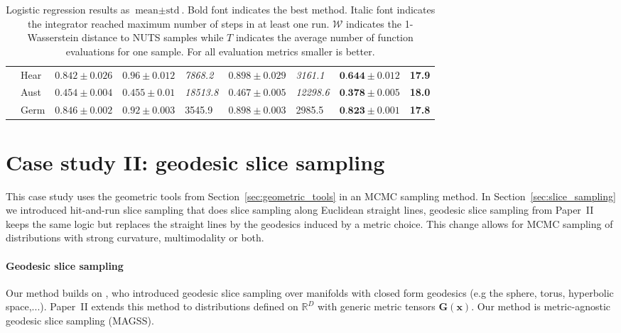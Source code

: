 \begin{table}
{\begin{tabular}{|l|l|l|l|l|l|l|l|l|}
			\cline{2-9}
			&Hear & $0.842 \pm 0.026$ & $0.96 \pm 0.012$ & \textit{7868.2} & $0.898 \pm 0.029$ & \textit{3161.1} & $\textbf{0.644} \pm 0.012$ & \textbf{17.9} \\
			\cline{2-9}
			&Aust & $0.454 \pm 0.004$ & $0.455 \pm 0.01$ & \textit{18513.8} & $0.467 \pm 0.005$ & \textit{12298.6} & $\textbf{0.378} \pm 0.005$ & \textbf{18.0} \\
			\cline{2-9}
			&Germ & $0.846 \pm 0.002$ & $0.92 \pm 0.003$ & 3545.9 & $0.898 \pm 0.003$ & 2985.5 & $\textbf{0.823} \pm 0.001$ & \textbf{17.8} \\
			\hline
		\end{tabular}
        }	
	\caption{Logistic regression results as $\text{mean} \pm \text{std}$. Bold font indicates the best method. Italic font indicates the integrator reached maximum number of steps in at least one run. $\mathcal{W}$ indicates the 1-Wasserstein distance to NUTS samples while $T$ indicates the average number of function evaluations for one sample. For all evaluation metrics smaller is better.}
	\label{tbl:lr}
\end{table}





\section{Case study II: geodesic slice sampling} \label{sec:geodesic_slice}
This case study uses the geometric tools from Section~\ref{sec:geometric_tools} in an MCMC sampling method.  In Section~\ref{sec:slice_sampling} we introduced  hit-and-run slice sampling that does slice sampling along Euclidean straight lines,  geodesic slice sampling from Paper~II keeps the same logic but replaces the straight lines by the geodesics induced by a metric choice. This change allows for MCMC sampling of distributions with strong curvature, multimodality or both.  

\paragraph{Geodesic slice sampling}
Our method builds on \citet{durmus2026geodesic}, who introduced geodesic slice sampling  over manifolds with closed form geodesics (e.g the sphere, torus, hyperbolic space,...). Paper~II extends this method to distributions defined on $\mathbb{R}^D$ with generic metric tensors $\mathbf{G}(\boldsymbol{x})$. Our method is metric-agnostic geodesic slice sampling (MAGSS).

